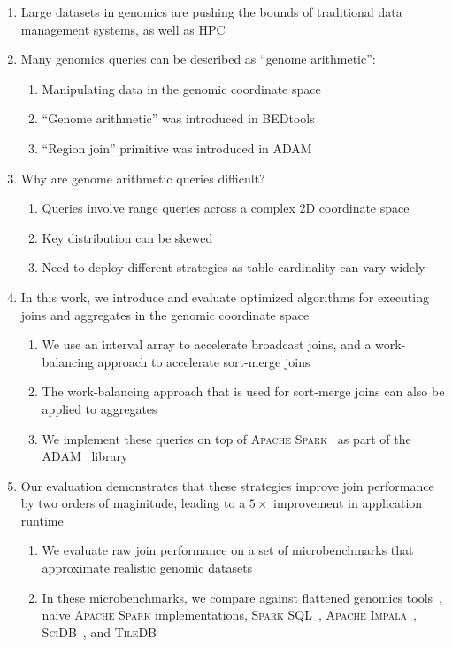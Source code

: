 \documentclass{vldb}
\begin{document}
\begin{enumerate}
\item Large datasets in genomics are pushing the bounds of traditional
data management systems, as well as HPC
\item Many genomics queries can be described as ``genome arithmetic'':
\begin{enumerate}
\item Manipulating data in the genomic coordinate space
\item ``Genome arithmetic'' was introduced in BEDtools~\cite{quinlan10}
\item ``Region join'' primitive was introduced in ADAM~\cite{nothaft15}
\end{enumerate}
\item Why are genome arithmetic queries difficult?
\begin{enumerate}
\item Queries involve range queries across a complex 2D coordinate space
\item Key distribution can be skewed
\item Need to deploy different strategies as table cardinality can vary
widely~\cite{kozanitis16}
\end{enumerate}
\item In this work, we introduce and evaluate optimized algorithms for executing
joins and aggregates in the genomic coordinate space
\begin{enumerate}
\item We use an interval array to accelerate broadcast joins, and a work-balancing
approach to accelerate sort-merge joins
\item The work-balancing approach that is used for sort-merge joins can also be
applied to aggregates
\item We implement these queries on top of \textsc{Apache Spark}~\cite{zaharia12,
zaharia10} as part of the \textsc{ADAM}~\cite{massie13, nothaft15} library
\end{enumerate}
\item Our evaluation demonstrates that these strategies improve join performance
by two orders of maginitude, leading to a $5\times$ improvement in application
runtime
\begin{enumerate}
\item We evaluate raw join performance on a set of microbenchmarks that approximate
realistic genomic datasets
\item In these microbenchmarks, we compare against flattened genomics
tools~\cite{quinlan10}, na\"{i}ve \textsc{Apache Spark} implementations,
\textsc{Spark SQL}~\cite{armbrust15}, \textsc{Apache Impala}~\cite{kornacker15},
\textsc{SciDB}~\cite{brown10, taft14}, and \textsc{TileDB}~\cite{papadopoulos16}
\end{enumerate}
\end{enumerate}
\end{document}
